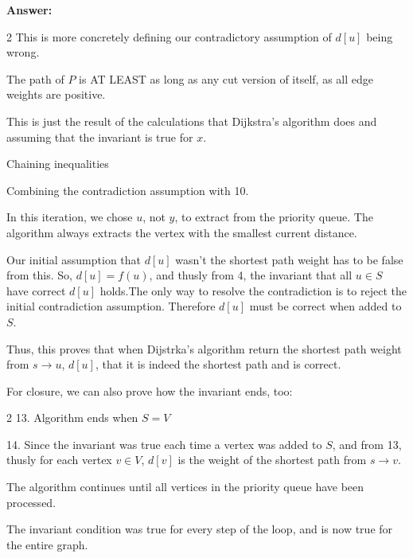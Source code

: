 \documentclass[11pt]{article}
\newenvironment{questions}
  {\begin{enumerate}}
  {\end{enumerate}}
\newenvironment{answer}
  {\vspace{0.5em}\noindent\textbf{Answer:}\par}
  {\vspace{1em}}
\newenvironment{answercols}
  {\begin{multicols}{2}}
  {\end{multicols}}
\begin{document}
\begin{questions}
\begin{answer}
\begin{answercols}
                This is more concretely defining our contradictory assumption of $d[u]$ being wrong.

                The path of $P$ is AT LEAST as long as any cut version of itself, as all edge weights are positive.

                This is just the result of the calculations that Dijkstra’s algorithm does and assuming that the invariant is true for $x$.

                Chaining inequalities

                Combining the contradiction assumption with 10.

                In this iteration, we chose $u$, not $y$, to extract from the priority queue. The algorithm always extracts the vertex with the smallest current distance.

                Our initial assumption that $d[u]$ wasn’t the shortest path weight has to be false from this. So, $d[u]=f(u)$, and thusly from 4, the invariant that all $u \in S$ have correct $d[u]$ holds.\newline\newline The only way to resolve the contradiction is to reject the initial contradiction assumption. Therefore $d[u]$ must be correct when added to $S$.
            \end{answercols}

            Thus, this proves that when Dijstrka’s algorithm return the shortest path weight from $s \to u$, $d[u]$, that it is indeed the shortest path and is correct.

            For closure, we can also prove how the invariant ends, too:

            \begin{answercols}
                13. Algorithm ends when $S=V$

                14. Since the invariant was true each time a vertex was added to $S$, and from 13, thusly for each vertex $v \in V$, $d[v]$ is the weight of the shortest path from $s \to v$.

                \columnbreak

                The algorithm continues until all vertices in the priority queue have been processed.

                The invariant condition was true for every step of the loop, and is now true for the entire graph.
            \end{answercols}
        \end{answer}
    \end{questions}
\end{document}
